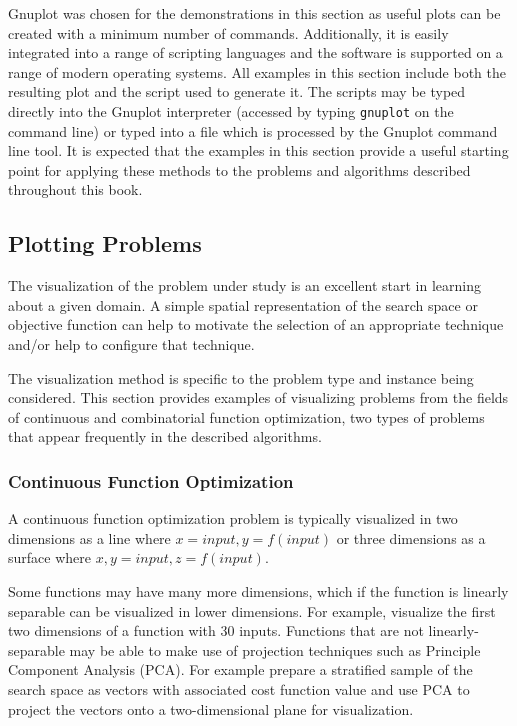 Gnuplot was chosen for the demonstrations in this section as useful plots can be created with a minimum number of commands. Additionally, it is easily integrated into a range of scripting languages and the software is supported on a range of modern operating systems. 
All examples in this section include both the resulting plot and the script used to generate it. The scripts may be typed directly into the Gnuplot interpreter (accessed by typing \texttt{gnuplot} on the command line) or typed into a file which is processed by the Gnuplot command line tool. It is expected that the examples in this section provide a useful starting point for applying these methods to the problems and algorithms described throughout this book.

%
%
\subsection{Plotting Problems}
The visualization of the problem under study is an excellent start in learning about a given domain. A simple spatial representation of the search space or objective function can help to motivate the selection of an appropriate technique and/or help to configure that technique. 

The visualization method is specific to the problem type and instance being considered. 
This section provides examples of visualizing problems from the fields of continuous and combinatorial function optimization, two types of problems that appear frequently in the described algorithms.

\subsubsection{Continuous Function Optimization}
A continuous function optimization problem is typically visualized in two dimensions as a line where $x=input, y=f(input)$ or three dimensions as a surface where $x,y=input, z=f(input)$. 

Some functions may have many more dimensions, which if the function is linearly separable can be visualized in lower dimensions. For example, visualize the first two dimensions of a function with 30 inputs. Functions that are not linearly-separable may be able to make use of projection techniques such as Principle Component Analysis (PCA). For example prepare a stratified sample of the search space as vectors with associated cost function value and use PCA to project the vectors onto a two-dimensional plane for visualization.

